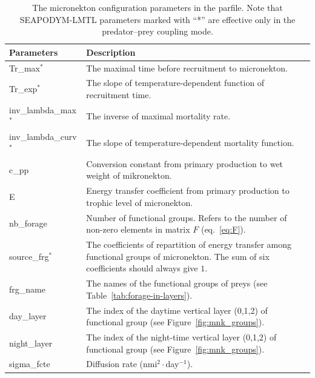 \begin{table}[H]
\caption{The micronekton configuration parameters in the parfile. Note that SEAPODYM-LMTL parameters marked with ``*'' are effective only in the predator--prey coupling mode.}
\begin{tabular}{p{3.5cm}p{12.0cm}}
    \hline
    {\bfseries Parameters} & {\bfseries Description}\\ \hline\hline
    {\ttfamily Tr\_max}$^*$ & The maximal time before recruitment to micronekton. \\\hline
    {\ttfamily Tr\_exp}$^*$ & The slope of temperature-dependent function of recruitment time. \\\hline
    {\ttfamily inv\_lambda\_max}$^*$ &  The inverse of maximal mortality rate. \\\hline
    {\ttfamily inv\_lambda\_curv}$^*$ &  The slope of temperature-dependent mortality function. \\\hline
    {\ttfamily c\_pp} & Conversion constant from primary production to wet weight of mikronekton. \\\hline
    {\ttfamily E} & Energy transfer coefficient from primary production to trophic level of micronekton. \\\hline
    {\ttfamily nb\_forage} & Number of functional groups. Refers to the number of non-zero elements in matrix $F$ (eq.~\ref{eq:F}).\\\hline
    {\ttfamily source\_frg}$^*$ & The coefficients of repartition of energy transfer among functional groups of micronekton.  The sum of six coefficients should always give $1$. \\\hline
    {\ttfamily frg\_name} & The names of the functional groups of preys (see Table~\ref{tab:forage-in-layers}). \\\hline
    {\ttfamily day\_layer } & The index of the daytime vertical layer (0,1,2) of functional group (see Figure~\ref{fig:mnk_groups}). \\\hline
    {\ttfamily night\_layer} &  The index of the night-time vertical layer (0,1,2) of functional group (see Figure~\ref{fig:mnk_groups}). \\\hline
    {\ttfamily sigma\_fcte} & Diffusion rate (nmi$^2\cdot$day$^{-1}$).\\ \hline
\end{tabular}
\label{tab:conf_prey_model}
\end{table}


